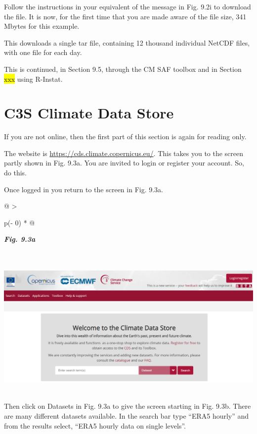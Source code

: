 \documentclass[
  letterpaper,
  DIV=11,
  numbers=noendperiod]{scrreprt}
\begin{document}
Follow the instructions in your equivalent of the message in Fig. 9.2i
to download the file. It is now, for the first time that you are made
aware of the file size, 341 Mbytes for this example.

This downloads a single tar file, containing 12 thousand individual
NetCDF files, with one file for each day.

This is continued, in Section 9.5, through the CM SAF toolbox and in
Section \hl{xxx} using R-Instat.

\section{C3S Climate Data Store}\label{c3s-climate-data-store}

If you are not online, then the first part of this section is again for
reading only.

The website is \url{https://cds.climate.copernicus.eu/}. This takes you
to the screen partly shown in Fig. 9.3a. You are invited to login or
register your account. So, do this.

Once logged in you return to the screen in Fig. 9.3a.

\begin{longtable}[]{@{}
  >{\raggedright\arraybackslash}p{(\columnwidth - 0\tabcolsep) * }@{}}
\toprule\noalign{}
\begin{minipage}[b]{\linewidth}\raggedright
\textbf{\emph{Fig. 9.3a}}
\end{minipage} \\
\midrule\noalign{}
\endhead
\bottomrule\noalign{}
\endlastfoot
\includegraphics[width=6.12478in,height=2.76178in]{figures/Fig9.3a.png} \\
\end{longtable}

Then click on Datasets in Fig. 9.3a to give the screen starting in Fig.
9.3b. There are many different datasets available. In the search bar
type ``ERA5 hourly'' and from the results select, ``ERA5 hourly data on
single levels''.
\end{document}
